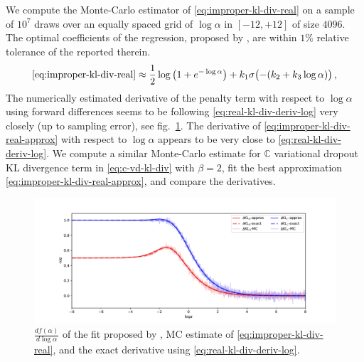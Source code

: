 \documentclass[a4paper,10pt]{article}
\newcommand{\cplx}{\mathbb{C}}
\begin{document}
We compute the Monte-Carlo estimator of \eqref{eq:improper-kl-div-real} on a sample of $10^7$
draws over an equally spaced grid of $\log \alpha$ in $[-12, +12]$ of size $4096$. The optimal
coefficients of the regression, proposed by \citet{molchanov_variational_2017}, are within
$1\%$ relative tolerance of the reported therein.
\begin{equation}  \label{eq:improper-kl-div-real-approx}
  \eqref{eq:improper-kl-div-real}
  \approx
    \frac12 \log{\bigl(1 + e^{-\log \alpha}\bigr)}
    + k_1 \sigma\bigl(- (k_2 + k_3 \log \alpha)\bigr)
  \,,
\end{equation}
The numerically estimated derivative of the penalty term with respect to $\log \alpha$ using
forward differences seems to be following \eqref{eq:real-kl-div-deriv-log} very closely (up to
sampling error), see fig.~\ref{fig:molchanov-derivative-replica}. The derivative of
\eqref{eq:improper-kl-div-real-approx} with respect to $\log \alpha$ appears to be very close
to \eqref{eq:real-kl-div-deriv-log}. We compute a similar Monte-Carlo estimate for
$\cplx$ variational dropout KL divergence term in \eqref{eq:c-vd-kl-div} with $\beta = 2$,
fit the best approximation \eqref{eq:improper-kl-div-real-approx}, and compare the derivatives.

\begin{figure}[!h]
  \centering
  \includegraphics[width=\columnwidth]{grad_log.pdf}
  \caption{$\tfrac{d f(\alpha)}{d \log{\alpha}}$ of the fit proposed by
  \citet{molchanov_variational_2017}, MC estimate of \eqref{eq:improper-kl-div-real},
  and the exact derivative using \eqref{eq:real-kl-div-deriv-log}.}
  \label{fig:molchanov-derivative-replica}
\end{figure}
\end{document}
